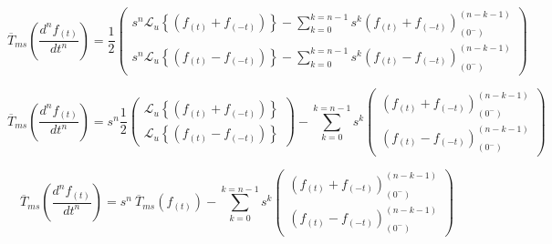 \documentclass[12pt]{article}
\begin{document}
$$\overline{T}_{ms}\left(\frac{d^n f_{(t)}}{dt^n}\right) = \frac12
\begin{pmatrix}
s^n\mathcal{L}_u\left\{(f_{(t)} + f_{(-t)})\right\} -\sum\limits_{k=0}^{k=n-1} s^k (f_{(t)} + f_{(-t)})^{(n-k-1)}_{(0^-)}\\[0.5 cm]
s^n\mathcal{L}_u\left\{(f_{(t)} - f_{(-t)})\right\} -\sum\limits_{k=0}^{k=n-1} s^k (f_{(t)} - f_{(-t)})^{(n-k-1)}_{(0^-)}
\end{pmatrix}
$$

$$\overline{T}_{ms}\left(\frac{d^n f_{(t)}}{dt^n}\right) =s^n \frac12
\begin{pmatrix}
\mathcal{L}_u\left\{(f_{(t)} + f_{(-t)})\right\} \\[0.5 cm]
\mathcal{L}_u\left\{(f_{(t)} - f_{(-t)})\right\} 
\end{pmatrix}
- \sum\limits_{k=0}^{k=n-1} s^k
\begin{pmatrix}
 (f_{(t)} + f_{(-t)})^{(n-k-1)}_{(0^-)}\\[0.5 cm]
 (f_{(t)} - f_{(-t)})^{(n-k-1)}_{(0^-)}
\end{pmatrix}
$$

$$\overline{T}_{ms}\left(\frac{d^n f_{(t)}}{dt^n}\right) =s^n\  \overline{T}_{ms}(f_{(t)})
- \sum\limits_{k=0}^{k=n-1} s^k
\begin{pmatrix}
 (f_{(t)} + f_{(-t)})^{(n-k-1)}_{(0^-)}\\[0.5 cm]
 (f_{(t)} - f_{(-t)})^{(n-k-1)}_{(0^-)}
\end{pmatrix}
$$
\newpage
\end{document}
